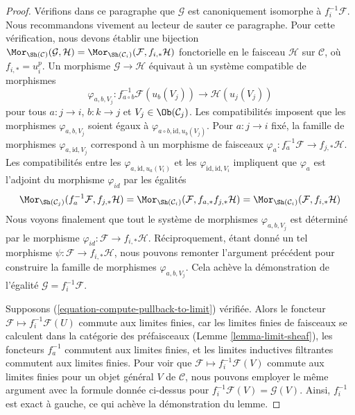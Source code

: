 \begin{proof}
\medskip\noindent
Vérifions dans ce paragraphe que $\mathcal{G}$ est canoniquement isomorphe à
$f_i^{-1}\mathcal{F}$. Nous recommandons vivement au lecteur de sauter ce paragraphe.
Pour cette vérification, nous devons établir une bijection
$\Mor_{\Sh(\mathcal{C})}(\mathcal{G}, \mathcal{H}) =
\Mor_{\Sh(\mathcal{C}_i)}(\mathcal{F}, f_{i, *}\mathcal{H})$
fonctorielle en le faisceau $\mathcal{H}$ sur $\mathcal{C}$,
où $f_{i, *} = u_i^p$. Un morphisme
$\mathcal{G} \to \mathcal{H}$ équivaut à un système compatible de morphismes
$$
\varphi_{a, b, V_j} :
f_{a \circ b}^{-1}\mathcal{F}(u_b(V_j))
\longrightarrow
\mathcal{H}(u_j(V_j))
$$
pour tous $a : j \to i$, $b : k \to j$ et
$V_j \in \Ob(\mathcal{C}_j)$.
Les compatibilités imposent que les morphismes $\varphi_{a, b, V_j}$ soient
égaux à $\varphi_{a \circ b, \text{id}, u_b(V_j)}$. Pour $a : j \to i$ fixé,
la famille de morphismes $\varphi_{a, \text{id}, V_j}$ correspond à un morphisme
de faisceaux $\varphi_a : f_a^{-1}\mathcal{F} \to f_{j, *}\mathcal{H}$.
Les compatibilités entre les $\varphi_{a, \text{id}, u_a(V_i)}$ et les
$\varphi_{\text{id}, \text{id}, V_i}$ impliquent que $\varphi_a$
est l’adjoint du morphisme $\varphi_{id}$ par les égalités
$$
\Mor_{\Sh(\mathcal{C}_j)}(f_a^{-1}\mathcal{F}, f_{j, *}\mathcal{H}) =
\Mor_{\Sh(\mathcal{C}_i)}(\mathcal{F}, f_{a, *}f_{j, *}\mathcal{H}) =
\Mor_{\Sh(\mathcal{C}_i)}(\mathcal{F}, f_{i, *}\mathcal{H})
$$
Nous voyons finalement que tout le système de morphismes
$\varphi_{a, b, V_j}$ est déterminé par le morphisme
$\varphi_{id} : \mathcal{F} \to f_{i, *}\mathcal{H}$.
Réciproquement, étant donné un tel morphisme
$\psi : \mathcal{F} \to f_{i, *}\mathcal{H}$, nous pouvons remonter
l’argument précédent pour construire la famille de morphismes
$\varphi_{a, b, V_j}$. Cela achève la démonstration de l’égalité
$\mathcal{G} = f_i^{-1}\mathcal{F}$.

\medskip\noindent
Supposons (\ref{equation-compute-pullback-to-limit}) vérifiée. Alors le foncteur
$\mathcal{F} \mapsto f_i^{-1}\mathcal{F}(U)$ commute aux limites finies,
car les limites finies de faisceaux se calculent dans la catégorie des préfaisceaux
(Lemme \ref{lemma-limit-sheaf}), les foncteurs $f_a^{-1}$ commutent aux limites
finies, et les limites inductives filtrantes commutent aux limites finies.
Pour voir que $\mathcal{F} \mapsto f_i^{-1}\mathcal{F}(V)$ commute aux limites
finies pour un objet général $V$ de $\mathcal{C}$, nous pouvons employer le même
argument avec la formule donnée ci-dessus pour
$f_i^{-1}\mathcal{F}(V) = \mathcal{G}(V)$.
Ainsi, $f_i^{-1}$ est exact à gauche, ce qui achève la démonstration du lemme.
\end{proof}


